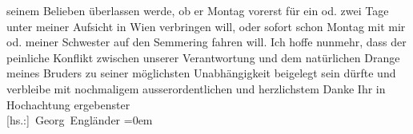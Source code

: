 \begin{ledgroupsized}[t]{13cm}
               seinem Belieben überlassen werde, ob er Montag vorerst für ein od. zwei
               Tage unter meiner Aufsicht in Wien verbringen
               will, oder sofort schon Montag mit mir od. meiner Schwester auf den Semmering fahren will.\pend
           \pstart
           Ich hoffe nunmehr, dass der peinliche Konflikt zwischen unserer Verantwortung und dem
               natürlichen Drange meines Bruders zu seiner möglichsten Unabhängigkeit beigelegt sein dürfte und
               verbleibe mit nochmaligem ausserordentlichen und herzlichstem Danke Ihr in\pend
           \pstart
           Hochachtung ergebenster{\\[\baselineskip]}\spacefill\mbox{{[}hs.:{]} Georg Engländer}\pend
           \leftskip=0em{}
         
         \endnumbering{}\end{ledgroupsized}  \newcommand{\dateiname}{L02131}\newcommand{\titel}{Georg Engländer an Arthur Schnitzler, 25. 4. 1913}\newcommand{\editorInnen}{Martin Anton Müller und Gerd-Hermann Susen}
      
